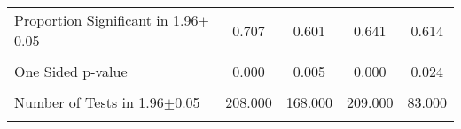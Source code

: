 {\begin{tabular}{l*{4}{c}}
                &                  &                  &                  &                  \\
\hline Proportion Significant in 1.96$\pm$0.05&    0.707         &    0.601         &    0.641         &    0.614         \\
                &                  &                  &                  &                  \\
One Sided p-value&    0.000         &    0.005         &    0.000         &    0.024         \\
                &                  &                  &                  &                  \\
Number of Tests in 1.96$\pm$0.05&  208.000         &  168.000         &  209.000         &   83.000         \\
                &                  &                  &                  &                  \\
\hline\hline
\end{tabular}
}
